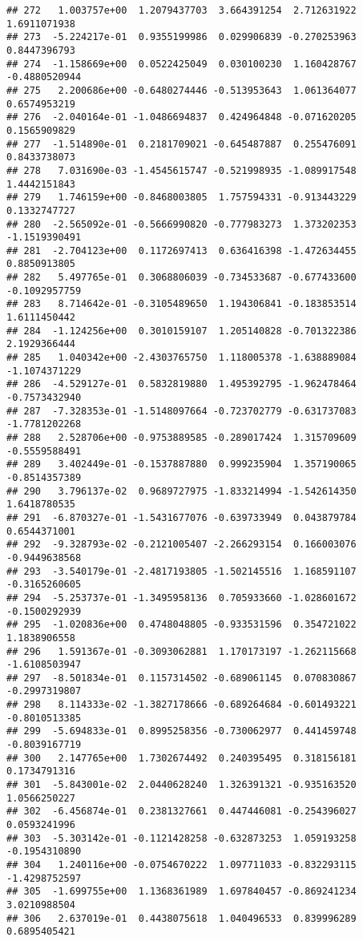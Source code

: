 \documentclass[
]{article}
\begin{document}
\begin{verbatim}
## 272   1.003757e+00  1.2079437703  3.664391254  2.712631922  1.6911071938
## 273  -5.224217e-01  0.9355199986  0.029906839 -0.270253963  0.8447396793
## 274  -1.158669e+00  0.0522425049  0.030100230  1.160428767 -0.4880520944
## 275   2.200686e+00 -0.6480274446 -0.513953643  1.061364077  0.6574953219
## 276  -2.040164e-01 -1.0486694837  0.424964848 -0.071620205  0.1565909829
## 277  -1.514890e-01  0.2181709021 -0.645487887  0.255476091  0.8433738073
## 278   7.031690e-03 -1.4545615747 -0.521998935 -1.089917548  1.4442151843
## 279   1.746159e+00 -0.8468003805  1.757594331 -0.913443229  0.1332747727
## 280  -2.565092e-01 -0.5666990820 -0.777983273  1.373202353 -1.1519390491
## 281  -2.704123e+00  0.1172697413  0.636416398 -1.472634455  0.8850913805
## 282   5.497765e-01  0.3068806039 -0.734533687 -0.677433600 -0.1092957759
## 283   8.714642e-01 -0.3105489650  1.194306841 -0.183853514  1.6111450442
## 284  -1.124256e+00  0.3010159107  1.205140828 -0.701322386  2.1929366444
## 285   1.040342e+00 -2.4303765750  1.118005378 -1.638889084 -1.1074371229
## 286  -4.529127e-01  0.5832819880  1.495392795 -1.962478464 -0.7573432940
## 287  -7.328353e-01 -1.5148097664 -0.723702779 -0.631737083 -1.7781202268
## 288   2.528706e+00 -0.9753889585 -0.289017424  1.315709609 -0.5559588491
## 289   3.402449e-01 -0.1537887880  0.999235904  1.357190065 -0.8514357389
## 290   3.796137e-02  0.9689727975 -1.833214994 -1.542614350  1.6418780535
## 291  -6.870327e-01 -1.5431677076 -0.639733949  0.043879784  0.6544371001
## 292  -9.328793e-02 -0.2121005407 -2.266293154  0.166003076 -0.9449638568
## 293  -3.540179e-01 -2.4817193805 -1.502145516  1.168591107 -0.3165260605
## 294  -5.253737e-01 -1.3495958136  0.705933660 -1.028601672 -0.1500292939
## 295  -1.020836e+00  0.4748048805 -0.933531596  0.354721022  1.1838906558
## 296   1.591367e-01 -0.3093062881  1.170173197 -1.262115668 -1.6108503947
## 297  -8.501834e-01  0.1157314502 -0.689061145  0.070830867 -0.2997319807
## 298   8.114333e-02 -1.3827178666 -0.689264684 -0.601493221 -0.8010513385
## 299  -5.694833e-01  0.8995258356 -0.730062977  0.441459748 -0.8039167719
## 300   2.147765e+00  1.7302674492  0.240395495  0.318156181  0.1734791316
## 301  -5.843001e-02  2.0440628240  1.326391321 -0.935163520  1.0566250227
## 302  -6.456874e-01  0.2381327661  0.447446081 -0.254396027  0.0593241996
## 303  -5.303142e-01 -0.1121428258 -0.632873253  1.059193258 -0.1954310890
## 304   1.240116e+00 -0.0754670222  1.097711033 -0.832293115 -1.4298752597
## 305  -1.699755e+00  1.1368361989  1.697840457 -0.869241234  3.0210988504
## 306   2.637019e-01  0.4438075618  1.040496533  0.839996289  0.6895405421

\end{verbatim}
\end{document}
